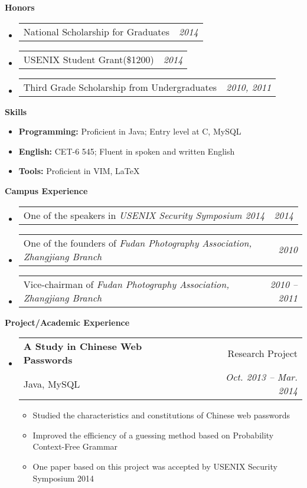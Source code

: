 \documentclass[letterpaper,10pt]{article}
\makeatletter
\newcommand{\resitem}[1]{\item #1 \vspace{-2pt}}
\newcommand{\resheading}[1]{{\large \colorbox{mygrey}{\begin{minipage}{\textwidth}{\textbf{#1 \vphantom{p\^{E}}}}\end{minipage}}}}
\newcommand{\ressubheading}[4]{
\begin{tabular*}{6.5in}{l@{\extracolsep{\fill}}r}
		\textbf{#1} & #2 \\
		#3 & #4 \\
\end{tabular*}\vspace{-6pt}}
\newcommand{\cvitem}[2]{
\begin{tabular*}{6.5in}{l@{\extracolsep{\fill}}r}
		#1 & #2 \\
\end{tabular*}\vspace{-1pt}}
\makeatother
\begin{document}
\resheading{Honors}
	\begin{itemize}
		\item \cvitem{National Scholarship for Graduates}{\emph{2014}}
		\item \cvitem{USENIX Student Grant(\$1200)}{\emph{2014}}
		\item \cvitem{Third Grade Scholarship from Undergraduates}{\emph{2010, 2011}}
	\end{itemize}

\resheading{Skills}
	\begin{itemize}
		\item
            \textbf{Programming:} Proficient in Java; Entry level at C, MySQL
        \item    
            \textbf{English:} CET-6 545; Fluent in spoken and written English
        \item   
            \textbf{Tools:} Proficient in VIM, \LaTeX 
	\end{itemize} %

\resheading{Campus Experience}
	\begin{itemize}
		\item \cvitem{One of the speakers in \emph{USENIX Security Symposium 2014}}{\emph{2014}}
		\item \cvitem{One of the founders of \emph{Fudan Photography Association, Zhangjiang Branch}}{\emph{2010}}
		\item \cvitem{Vice-chairman of \emph{Fudan Photography Association, Zhangjiang Branch}}{\emph{2010 -- 2011}}
	\end{itemize}


\resheading{Project/Academic Experience}
	\begin{itemize}
		\item
			\ressubheading{A Study in Chinese Web Passwords}{Research Project}{Java, MySQL}{\emph{Oct. 2013 -- Mar. 2014}}
			{\begin{itemize}
				\resitem{Studied the characteristics and constitutions of Chinese web passwords}
                \resitem{Improved the efficiency of a guessing method based on Probability Context-Free Grammar}
				\resitem{One paper based on this project was accepted by USENIX Security Symposium 2014}
			\end{itemize}}
	\end{itemize}
			
\end{document}
